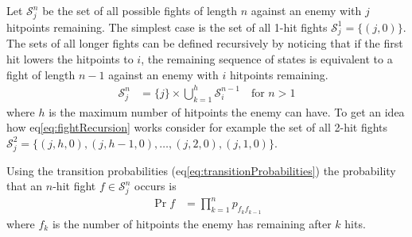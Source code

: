 Let $\mathcal{S}_j^n$ be the set of all possible fights of length $n$ against an enemy with $j$ hitpoints remaining. The simplest case is the set of all 1-hit fights $\mathcal{S}_j^1 = \{(j,0)\}$. The sets of all longer fights can be defined recursively by noticing that if the first hit lowers the hitpoints to $i$, the remaining sequence of states is equivalent to a fight of length $n-1$ against an enemy with $i$ hitpoints remaining.
\begin{align}
    \mathcal{S}_j^n &=  \{j\} \times \bigcup_{k=1}^h \mathcal{S}_i^{n-1} \quad \mbox{for } n>1\label{eq:fightRecursion}
\end{align}
where $h$ is the maximum number of hitpoints the enemy can have. To get an idea how eq\ref{eq:fightRecursion} works consider for example the set of all 2-hit fights $\mathcal{S}_j^2 = \{(j,h,0), (j,h-1,0), \ldots, (j,2,0), (j,1,0)\}$.

Using the transition probabilities (eq\ref{eq:transitionProbabilities}) the probability that an $n$-hit fight $f \in \mathcal{S}_{j}^n$ occurs is
\begin{align}
    \Pr{f} &= \prod_{k=1}^{n} p_{f_{k} f_{k-1}}
\end{align}
where $f_k$ is the number of hitpoints the enemy has remaining after $k$ hits.

